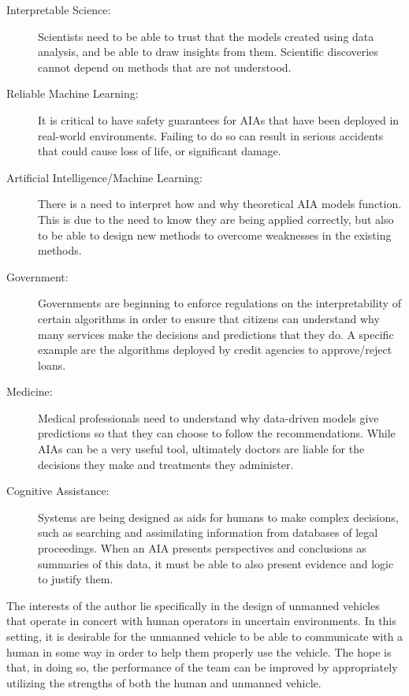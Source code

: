 %
    \begin{description}
        \item [Interpretable Science:] Scientists need to be able to trust that the models created using data analysis, and be able to draw insights from them. Scientific discoveries cannot depend on methods that are not understood.
        \item [Reliable Machine Learning:] It is critical to have safety guarantees for AIAs that have been deployed in real-world environments. Failing to do so can result in serious accidents that could cause loss of life, or significant damage.
        \item [Artificial Intelligence/Machine Learning:] There is a need to interpret how and why theoretical AIA models function. This is due to the need to know they are being applied correctly, but also to be able to design new methods to overcome weaknesses in the existing methods.
        \item [Government:] Governments are beginning to enforce regulations on the interpretability of certain algorithms in order to ensure that citizens can understand why many services make the decisions and predictions that they do. A specific example are the algorithms deployed by credit agencies to approve/reject loans.
        \item [Medicine:] Medical professionals need to understand why data-driven models give predictions so that they can choose to follow the recommendations. While AIAs can be a very useful tool, ultimately doctors are liable for the decisions they make and treatments they administer.
        \item [Cognitive Assistance:] Systems are being designed as aids for humans to make complex decisions, such as searching and assimilating information from databases of legal proceedings. When an AIA presents perspectives and conclusions as summaries of this data, it must be able to also present evidence and logic to justify them.
    \end{description}

    The interests of the author lie specifically in the design of unmanned vehicles that operate in concert with human operators in uncertain environments. In this setting, it is desirable for the unmanned vehicle to be able to communicate with a human in some way in order to help them properly use the vehicle. The hope is that, in doing so, the performance of the team can be improved by appropriately utilizing the strengths of both the human and unmanned vehicle.

